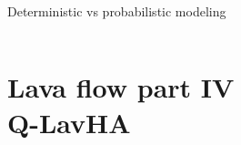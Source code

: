 \documentclass[10pt,aspectratio=169]{beamer}
\begin{document}
\begin{frame}[t]{Deterministic vs probabilistic modeling}
{\begin{columns}[T]
\begin{column}{0.5\textwidth}
    \end{column}
  \end{columns}
  }


\end{frame}


\section{\alert{Lava flow part IV} \\ Q-LavHA}
\end{document}
